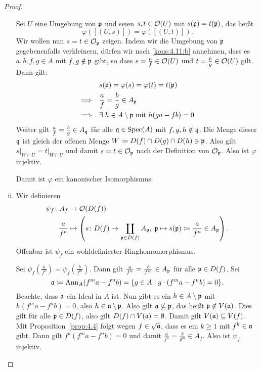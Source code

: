 \begin{prop}
\begin{proof}
\begin{enumerate}[i)]
			Sei $U$ eine Umgebung von $\mathfrak{p}$ und seien $s,t \in \mathcal{O}(U)$ mit $s(\mathfrak{p}) = t(\mathfrak{p})$, das heißt
			\[
				\varphi([(U,s)]) = \varphi([(U,t)]).
			\]
			Wir wollen nun $s=t \in \mathcal{O}_{\mathfrak{p}}$ zeigen. Indem wir die Umgebung von $\mathfrak{p}$ gegebenenfalls verkleinern, dürfen wir nach \ref{kons:4.11:b} annehmen, dass es $a,b,f,g \in A$ mit $f,g \notin \mathfrak{p}$ gibt, so dass $s = \frac{a}{f} \in \mathcal{O}(U)$ und $t=\frac{b}{g}\in \mathcal{O}(U)$ gilt. Dann gilt:
			\begin{align*}
				& s(\mathfrak{p}) = \varphi(s) = \varphi(t) = t(\mathfrak{p})\\
				\Longrightarrow \quad & \frac{a}{f} = \frac{b}{g} \in A_{\mathfrak{p}}\\
				\Longrightarrow \quad & \exists\; h \in A \setminus \mathfrak{p} \text{ mit } h(ga-fb)=0
			\end{align*}
			Weiter gilt $\frac{a}{f}=\frac{b}{g} \in A_{\mathfrak{q}}$ für alle $\mathfrak{q} \in \operatorname{Spec}(A)$ mit $f,g,h \notin \mathfrak{q}$. Die Menge dieser $\mathfrak{q}$ ist gleich der offenen Menge $W \coloneqq D(f)\cap D(g) \cap D(h) \ni \mathfrak{p}$. Also gilt $s\vert_{W\cap U} = t\vert_{W\cap U}$ und damit $s=t \in \mathcal{O}_{\mathfrak{p}}$ nach der Definition von $\mathcal{O}_{\mathfrak{p}}$. Also ist $\varphi$ injektiv.

			Damit ist $\varphi$ ein kanonischer Isomorphismus.

			\item Wir definieren
			\begin{align*}
				\psi_f\colon A_f &\to \mathcal{O}(D(f))\\
				\frac{a}{f^n} & \mapsto \left(s\colon D(f) \to \coprod_{\mathfrak{p} \in D(f)}A_{\mathfrak{p}},\; \mathfrak{p} \mapsto s(\mathfrak{p})\coloneqq \frac{a}{f^n}\in A_{\mathfrak{p}}\right).
			\end{align*}
			Offenbar ist $\psi_f$ ein wohldefinierter Ringhomomorphismus.

			Sei $\psi_f\left(\frac{a}{f^n}\right) = \psi_f \left(\frac{b}{f^m}\right)$. Dann gilt $\frac{a}{f^n}=\frac{b}{f^m} \in A_{\mathfrak{p}}$ für alle $\mathfrak{p} \in D(f)$. Sei
			\[
				\mathfrak{a}\coloneqq \operatorname{Ann}_A(f^m a-f^n b) = \{g \in A \mid g \cdot (f^m a - f^n b) = 0\}.
			\]
			Beachte, dass $\mathfrak{a}$ ein Ideal in $A$ ist. Nun gibt es ein $h \in A \setminus \mathfrak{p}$ mit $h(f^m a -f^n b) = 0$, also $h \in \mathfrak{a} \setminus \mathfrak{p}$. Also gilt $\mathfrak{a} \not \subseteq \mathfrak{p}$, das heißt $\mathfrak{p} \notin V(\mathfrak{a})$. Dies gilt für alle $\mathfrak{p} \in D(f)$, also gilt $D(f) \cap V(\mathfrak{a}) = \emptyset$. Damit gilt $V(\mathfrak{a}) \subseteq V(f)$. Mit Proposition~\ref{prop:4.4} folgt wegen $f \in \sqrt{\mathfrak{a}}$, dass es ein $k \ge 1$ mit $f^k \in \mathfrak{a}$ gibt. Dann gilt
			$f^k(f^m a -f^n b) = 0$ und damit $\frac{a}{f^n} = \frac{b}{g^m} \in A_f$. Also ist $\psi_f$ injektiv.


\end{enumerate}
\end{proof}
\end{prop}
